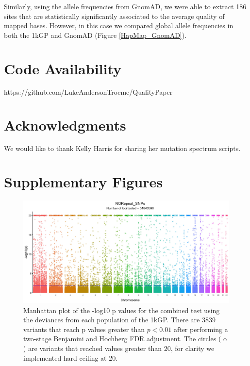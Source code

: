\documentclass[9pt,lineno]{elife}
\begin{document}
Similarly, using the allele frequencies from GnomAD, we were able to extract 186 sites that are statistically significantly associated to the average quality of mapped bases. However, in this case we compared global allele frequencies in both the 1kGP and GnomAD (Figure \ref{HapMap_GnomAD}). 

\section{Code Availability}
https://github.com/LukeAndersonTrocme/QualityPaper

\section{Acknowledgments}
We would like to thank Kelly Harris for sharing her mutation spectrum scripts.



\clearpage
\section{Supplementary Figures}

\renewcommand{\thefigure}{S\arabic{figure}}
\setcounter{figure}{0}   	

\begin{figure}[h]
\includegraphics[width=\hsize,keepaspectratio]{./Figures/ManhattanPlot_NORepeat_SNPs.jpg}

\caption{Manhattan plot of the -log10 p values for the combined test using the deviances from each population of the 1kGP. 
There are 3839 variants that reach p values greater than $ p < 0.01$ after performing a two-stage Benjamini and Hochberg FDR adjustment. 
The circles ( o ) are variants that reached values greater than 20, for clarity we implemented hard ceiling at 20.}
 \label{NRS_Manhattan}
\end{figure}
\end{document}
